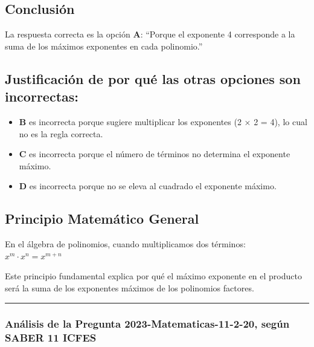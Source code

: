 \documentclass[
]{article}
\providecommand{\tightlist}{%
  \setlength{\itemsep}{0pt}\setlength{\parskip}{0pt}}
\begin{document}
\subsection{Conclusión}\label{conclusiuxf3n-15}

La respuesta correcta es la opción \textbf{A}: ``Porque el exponente 4
corresponde a la suma de los máximos exponentes en cada polinomio.''

\subsection{Justificación de por qué las otras opciones son
incorrectas:}\label{justificaciuxf3n-de-por-quuxe9-las-otras-opciones-son-incorrectas}

\begin{itemize}
\tightlist
\item
  \textbf{B} es incorrecta porque sugiere multiplicar los exponentes (2
  × 2 = 4), lo cual no es la regla correcta.
\item
  \textbf{C} es incorrecta porque el número de términos no determina el
  exponente máximo.
\item
  \textbf{D} es incorrecta porque no se eleva al cuadrado el exponente
  máximo.
\end{itemize}

\subsection{Principio Matemático
General}\label{principio-matemuxe1tico-general}

En el álgebra de polinomios, cuando multiplicamos dos términos:\\
\(x^m \cdot x^n = x^{m+n}\)

Este principio fundamental explica por qué el máximo exponente en el
producto será la suma de los exponentes máximos de los polinomios
factores.

\begin{center}\rule{0.5\linewidth}{0.5pt}\end{center}

\subsubsection{Análisis de la Pregunta 2023-Matematicas-11-2-20, según
SABER 11
ICFES}\label{anuxe1lisis-de-la-pregunta-2023-matematicas-11-2-20-seguxfan-saber-11-icfes}
\end{document}
